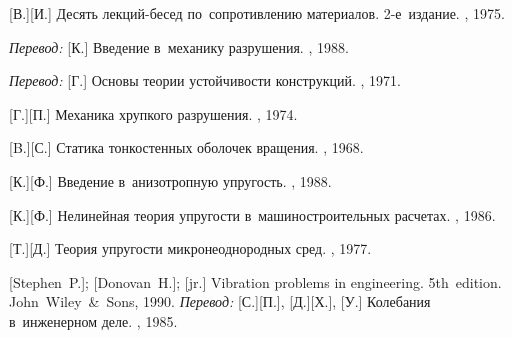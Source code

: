\begin{thebibliography}{123}
\begin{otherlanguage}{russian}
[В.][И.] Десять лекций\hbox{-}бесед по~сопротивлению материалов. 2\hbox{-}е~издание. \naukapublisher, 1975. 

\emph{Перевод:} [К.] Введение в~механику разрушения. \mirpublisher, 1988. 

\emph{Перевод:} [Г.] Основы теории устойчивости конструкций. \mirpublisher, 1971. 

[Г.][П.] Механика хрупкого разрушения. \naukapublisher, 1974. 

[B.][С.] Статика тонкостенных оболочек вращения. \naukapublisher, 1968. 

[К.][Ф.] Введение в~анизотропную упругость. \naukapublisher, 1988. 

[К.][Ф.] Нелинейная теория упругости в~машиностроительных расчетах. \maschinenbauleningraderverlag, 1986. 

[Т.][Д.] Теория упругости микронеоднородных сред. \naukapublisher, 1977. 

%
%



[Stephen~P.];
[Donovan~H.];
[jr.]
Vibration problems in engineering.
5th~edition. John~Wiley~\&~Sons, 1990. 
\emph{Перевод:} [С.][П.], [Д.][Х.], [У.] Колебания в~инженерном деле. \maschinenbaumoskauerverlag, 1985. 


\end{otherlanguage}
\end{thebibliography}
